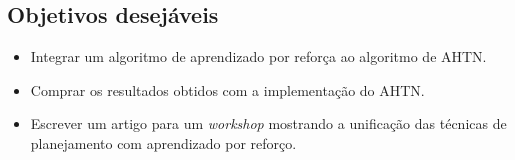 \subsection{Objetivos desejáveis}
\begin{itemize}
	\item Integrar um algoritmo de aprendizado por reforça ao algoritmo de AHTN.
	\item Comprar os resultados obtidos com a implementação do AHTN.
	\item Escrever um artigo para um \textit{workshop} mostrando a unificação das técnicas de planejamento com aprendizado por reforço.
\end{itemize}


